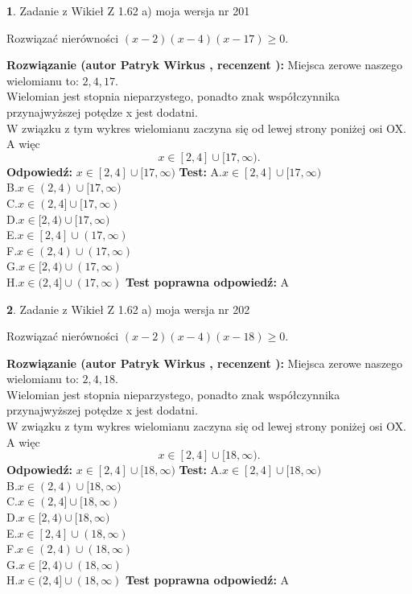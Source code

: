 \documentclass[12pt, a4paper]{article}
\theoremstyle{definition} %
\newtheorem{zad}{}
\newcommand{\zadStart}[1]{\begin{zad}#1\newline}
\newcommand{\zadStop}{\end{zad}}
\newcommand{\rozwStart}[2]{\noindent \textbf{Rozwiązanie (autor #1 , recenzent #2): }\newline}
\newcommand{\rozwStop}{\newline}
\newcommand{\odpStart}{\noindent \textbf{Odpowiedź:}\newline}
\newcommand{\odpStop}{\newline}
\newcommand{\testStart}{\noindent \textbf{Test:}\newline}
\newcommand{\testStop}{\newline}
\newcommand{\kluczStart}{\noindent \textbf{Test poprawna odpowiedź:}\newline}
\newcommand{\kluczStop}{\newline}
\begin{document}
\zadStart{Zadanie z Wikieł Z 1.62 a) moja wersja nr 201}

Rozwiązać nierówności $(x-2)(x-4)(x-17)\ge0$.
\zadStop
\rozwStart{Patryk Wirkus}{}
Miejsca zerowe naszego wielomianu to: $2, 4, 17$.\\
Wielomian jest stopnia nieparzystego, ponadto znak współczynnika przy\linebreak najwyższej potędze x jest dodatni.\\ W związku z tym wykres wielomianu zaczyna się od lewej strony poniżej osi OX. A więc $$x \in [2,4] \cup [17,\infty).$$
\rozwStop
\odpStart
$x \in [2,4] \cup [17,\infty)$
\odpStop
\testStart
A.$x \in [2,4] \cup [17,\infty)$\\
B.$x \in (2,4) \cup [17,\infty)$\\
C.$x \in (2,4] \cup [17,\infty)$\\
D.$x \in [2,4) \cup [17,\infty)$\\
E.$x \in [2,4] \cup (17,\infty)$\\
F.$x \in (2,4) \cup (17,\infty)$\\
G.$x \in [2,4) \cup (17,\infty)$\\
H.$x \in (2,4] \cup (17,\infty)$
\testStop
\kluczStart
A
\kluczStop



\zadStart{Zadanie z Wikieł Z 1.62 a) moja wersja nr 202}

Rozwiązać nierówności $(x-2)(x-4)(x-18)\ge0$.
\zadStop
\rozwStart{Patryk Wirkus}{}
Miejsca zerowe naszego wielomianu to: $2, 4, 18$.\\
Wielomian jest stopnia nieparzystego, ponadto znak współczynnika przy\linebreak najwyższej potędze x jest dodatni.\\ W związku z tym wykres wielomianu zaczyna się od lewej strony poniżej osi OX. A więc $$x \in [2,4] \cup [18,\infty).$$
\rozwStop
\odpStart
$x \in [2,4] \cup [18,\infty)$
\odpStop
\testStart
A.$x \in [2,4] \cup [18,\infty)$\\
B.$x \in (2,4) \cup [18,\infty)$\\
C.$x \in (2,4] \cup [18,\infty)$\\
D.$x \in [2,4) \cup [18,\infty)$\\
E.$x \in [2,4] \cup (18,\infty)$\\
F.$x \in (2,4) \cup (18,\infty)$\\
G.$x \in [2,4) \cup (18,\infty)$\\
H.$x \in (2,4] \cup (18,\infty)$
\testStop
\kluczStart
A
\kluczStop
\end{document}
